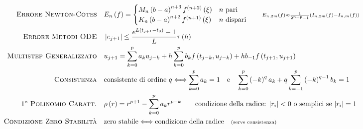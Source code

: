 \documentclass[a4paper,10pt]{article}
\theoremstyle{definition}
\theoremstyle{indentdefinition}
\theoremstyle{indenttheorem}
\theoremstyle{myremark}
\theoremstyle{indentgeneral}
\theoremstyle{plain}
\theoremstyle{plain}
\begin{document}
\begin{align*}
\text{\textsc{Errore Newton-Cotes}\quad} & E_{n}\left(f\right)=\begin{cases}
M_{n}\left(b-a\right)^{n+3}f^{\left(n+2\right)}\left(\xi\right) & n\text{ pari}\\
K_{n}\left(b-a\right)^{n+2}f^{\left(n+1\right)}\left(\xi\right) & n\text{ dispari}
\end{cases}\qquad{\scriptstyle E_{n,2m}\left(f\right)\approx\frac{1}{2^{n+p}-1}\left(I_{n,2m}\left(f\right)-I_{n,m}\left(f\right)\right)}\\
\textsc{Errore Metodi ODE}\quad & \left|e_{j+1}\right|\leq\frac{e^{L\left(t_{j+1}-t_{0}\right)}-1}{L}\tau\left(h\right)\\
\textsc{Multistep Generalizzato}\quad & u_{j+1}=\sum_{k=0}^{p}a_{k}u_{j-k}+h\sum_{k=0}^{p}b_{k}f\left(t_{j-k},u_{j-k}\right)+hb_{-1}f\left(t_{j+1},u_{j+1}\right)\\
\textsc{Consistenza}\quad & \text{consistente di ordine \ensuremath{q}}\Longleftrightarrow\sum_{k=0}^{p}a_{k}=1\quad\text{e}\quad\sum_{k=0}^{p}\left(-k\right)^{q}a_{k}+q\sum_{k=-1}^{p}\left(-k\right)^{q-1}b_{k}=1\\
\textsc{1° Polinomio Caratt.}\quad & \rho\left(r\right)=r^{p+1}-\sum_{k=0}^{p}a_{k}r^{p-k}\qquad\text{condizione della radice: \ensuremath{\left|r_{i}\right|<0} o semplici se \ensuremath{\left|r_{i}\right|=1} }\\
\textsc{Condizione Zero Stabilità}\quad & \text{zero stabile}\Longleftrightarrow\text{condizione della radice}\quad{\scriptstyle \text{(serve consistenza)}}
\end{align*}
\vspace{2em}
\end{document}
